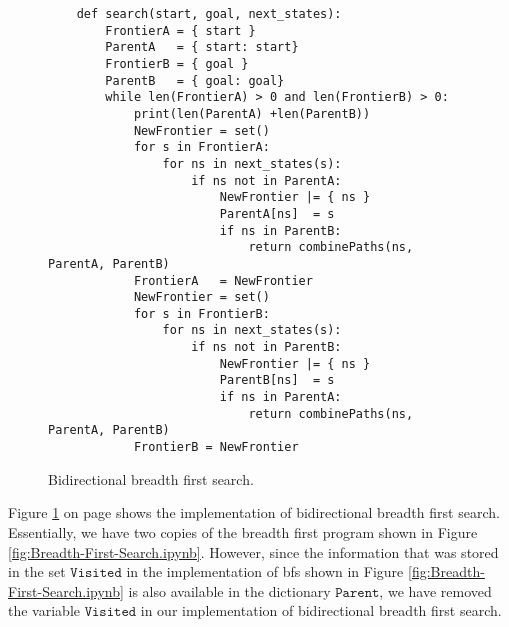 \begin{figure}[!ht]
\centering
\begin{verbatim}
    def search(start, goal, next_states):        
        FrontierA = { start }
        ParentA   = { start: start}
        FrontierB = { goal }
        ParentB   = { goal: goal} 
        while len(FrontierA) > 0 and len(FrontierB) > 0:
            print(len(ParentA) +len(ParentB))
            NewFrontier = set()
            for s in FrontierA:
                for ns in next_states(s):
                    if ns not in ParentA:
                        NewFrontier |= { ns }
                        ParentA[ns]  = s
                        if ns in ParentB:
                            return combinePaths(ns, ParentA, ParentB)
            FrontierA   = NewFrontier
            NewFrontier = set()
            for s in FrontierB:
                for ns in next_states(s):
                    if ns not in ParentB:
                        NewFrontier |= { ns }
                        ParentB[ns]  = s
                        if ns in ParentA:
                            return combinePaths(ns, ParentA, ParentB)
            FrontierB = NewFrontier
\end{verbatim}
\vspace*{-0.3cm}
\caption{Bidirectional breadth first search.}
\label{fig:Bidirectional-BFS.ipynb}
\end{figure}

Figure \ref{fig:Bidirectional-BFS.ipynb} on page \pageref{fig:Bidirectional-BFS.ipynb} shows the implementation
of bidirectional breadth first search.  Essentially, we have two copies of the breadth first program shown in
Figure \ref{fig:Breadth-First-Search.ipynb}.  However, since the information that was stored in the set
$\texttt{Visited}$ in the implementation of \ac{bfs} shown in Figure \ref{fig:Breadth-First-Search.ipynb} is
also available in the dictionary $\texttt{Parent}$, we have removed the variable $\texttt{Visited}$ in our
implementation of bidirectional breadth first search.

